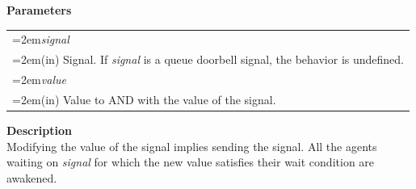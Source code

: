 \documentclass[final]{book}
\newcommand{\hsaarg}[1]{\textit{#1}}
\begin{document}
\noindent\textbf{Parameters}\\[-6mm]
\noindent\begin{longtable}{@{}>{\hangindent=2em}p{\textwidth}}
\hsaarg{signal}\\\hspace{2em}(in) Signal. If \textit{signal} is a queue doorbell signal, the behavior is undefined.\\[2mm]
\hsaarg{value}\\\hspace{2em}(in) Value to AND with the value of the signal.
\end{longtable}
\vspace{-5mm}\noindent\textbf{Description}\\[1mm]
Modifying the value of the signal implies sending the signal. All the agents waiting on \textit{signal} for which the new value satisfies their wait condition are awakened.
\end{document}
